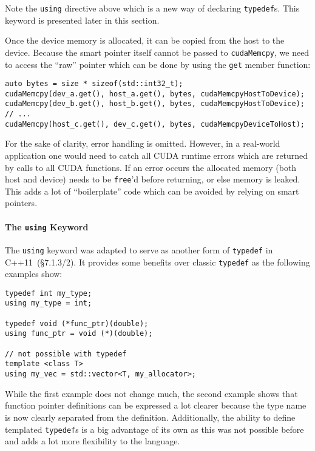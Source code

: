 \noindent Note the \texttt{using} directive above which is a new way of declaring \texttt{typedef}s. This keyword is presented later in this section.

Once the device memory is allocated, it can be copied from the host to the device. Because the smart pointer itself cannot be passed to \texttt{cudaMemcpy}, we need to access the ``raw'' pointer which can be done by using the \texttt{get} member function:

\begin{verbatim}
auto bytes = size * sizeof(std::int32_t);
cudaMemcpy(dev_a.get(), host_a.get(), bytes, cudaMemcpyHostToDevice);
cudaMemcpy(dev_b.get(), host_b.get(), bytes, cudaMemcpyHostToDevice);
// ...
cudaMemcpy(host_c.get(), dev_c.get(), bytes, cudaMemcpyDeviceToHost);
\end{verbatim}

\noindent For the sake of clarity, error handling is omitted. However, in a real-world application one would need to catch all CUDA runtime errors which are returned by calls to all CUDA functions. If an error occurs the allocated memory (both host and device) needs to be \texttt{free}'d before returning, or else memory is leaked. This adds a lot of ``boilerplate'' code which can be avoided by relying on smart pointers.

\paragraph{The \texttt{using} Keyword}

The \texttt{using} keyword was adapted to serve as another form of \texttt{typedef} in C++11~\cite{cpp11std}(§7.1.3/2). It provides some benefits over classic \texttt{typedef} as the following examples show:

\begin{verbatim}
typedef int my_type;
using my_type = int;

typedef void (*func_ptr)(double);
using func_ptr = void (*)(double);

// not possible with typedef
template <class T>
using my_vec = std::vector<T, my_allocator>;
\end{verbatim}

\noindent While the first example does not change much, the second example shows that function pointer definitions can be expressed a lot clearer because the type name is now clearly separated from the definition. Additionally, the ability to define templated \texttt{typedef}s is a big advantage of its own as this was not possible before and adds a lot more flexibility to the language.

